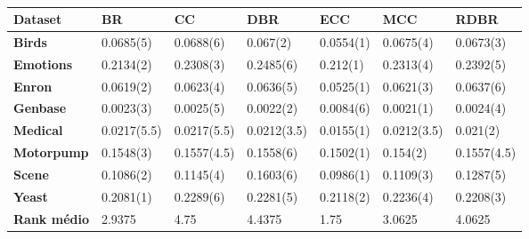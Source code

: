 \begin{table}[\tabmode]
\begin{tabular}{lllllll}
\hline
\textbf{Dataset}    & \textbf{BR} & \textbf{CC} & \textbf{DBR} & \textbf{ECC} & \textbf{MCC} & \textbf{RDBR} \\ \hline
\textbf{Birds}      & 0.0685(5)   & 0.0688(6)   & 0.067(2)     & 0.0554(1)    & 0.0675(4)    & 0.0673(3)     \\
\textbf{Emotions}   & 0.2134(2)   & 0.2308(3)   & 0.2485(6)    & 0.212(1)     & 0.2313(4)    & 0.2392(5)     \\
\textbf{Enron}      & 0.0619(2)   & 0.0623(4)   & 0.0636(5)    & 0.0525(1)    & 0.0621(3)    & 0.0637(6)     \\
\textbf{Genbase}    & 0.0023(3)   & 0.0025(5)   & 0.0022(2)    & 0.0084(6)    & 0.0021(1)    & 0.0024(4)     \\
\textbf{Medical}    & 0.0217(5.5) & 0.0217(5.5) & 0.0212(3.5)  & 0.0155(1)    & 0.0212(3.5)  & 0.021(2)      \\
\textbf{Motorpump}  & 0.1548(3)   & 0.1557(4.5) & 0.1558(6)    & 0.1502(1)    & 0.154(2)     & 0.1557(4.5)   \\
\textbf{Scene}      & 0.1086(2)   & 0.1145(4)   & 0.1603(6)    & 0.0986(1)    & 0.1109(3)    & 0.1287(5)     \\
\textbf{Yeast}      & 0.2081(1)   & 0.2289(6)   & 0.2281(5)    & 0.2118(2)    & 0.2236(4)    & 0.2208(3)     \\ \hline
\textbf{Rank médio} & 2.9375      & 4.75        & 4.4375       & 1.75         & 3.0625       & 4.0625        \\ \hline
\end{tabular}
\caption{}
\label{tab:HLlogi}
\end{table}